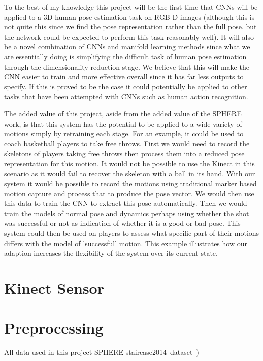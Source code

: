 \documentclass[11pt]{article} %
\begin{document}
To the best of my knowledge this project will be the first time that CNNs will be applied to a 3D human pose estimation task on RGB-D images (although this is not quite this since we find the pose representation rather than the full pose, but the network could be expected to perform this task reasonably well). It will also be a novel combination of CNNs and manifold learning methods since what we are essentially doing is simplifying the difficult task of human pose estimation through the dimensionality reduction stage. We believe that this will make the CNN easier to train and more effective overall since it has far less outputs to specify. If this is proved to be the case it could potentially be applied to other tasks that have been attempted with CNNs such as human action recognition.

The added value of this project, aside from the added value of the SPHERE work, is that this system has the potential to be applied to a wide variety of motions simply by retraining each stage. For an example, it could be used to coach basketball players to take free throws. First we would need to record the skeletons of players taking free throws then process them into a reduced pose representation for this motion. It would not be possible to use the Kinect in this scenario as it would fail to recover the skeleton with a ball in its hand. With our system it would be possible to record the motions using traditional marker based motion capture and process that to produce the pose vector. We would then use this data to train the CNN to extract this pose automatically. Then we would train the models of normal pose and dynamics perhaps using whether the shot was successful or not as indication of whether it is a good or bad pose. This system could then be used on players to assess what specific part of their motions differs with the model of 'successful' motion. This example illustrates how our adaption increases the flexibility of the system over its current state.




\section{Kinect Sensor}

\section{Preprocessing}
\label{sec:intro}
All data used in this project SPHERE-staircase2014~dataset~\cite{Paiement}) 




\end{document}
